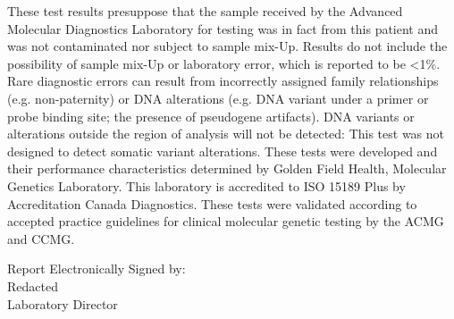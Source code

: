 \documentclass[10pt]{extarticle}
\begin{document}
These test results presuppose that the sample received by the Advanced Molecular Diagnostics Laboratory for testing was in fact from this patient and was not contaminated nor subject to sample mix-Up. Results do not include the possibility of sample mix-Up or laboratory error, which is reported to be <1\%. Rare diagnostic errors can result from incorrectly assigned family relationships (e.g. non-paternity) or DNA alterations (e.g. DNA variant under a primer or probe binding site; the presence of pseudogene artifacts). DNA variants or alterations outside the region of analysis will not be detected: This test was not designed to detect somatic variant alterations. These tests were developed and their performance characteristics determined by Golden Field Health, Molecular Genetics Laboratory. This laboratory is accredited to ISO 15189 Plus by Accreditation Canada Diagnostics. These tests were validated according to accepted practice guidelines for clinical molecular genetic testing by the ACMG and CCMG.

\vspace{2em}
\hfill \parbox{10cm}{
Report Electronically Signed by: \\
Redacted \\
Laboratory Director
}
\end{document}
